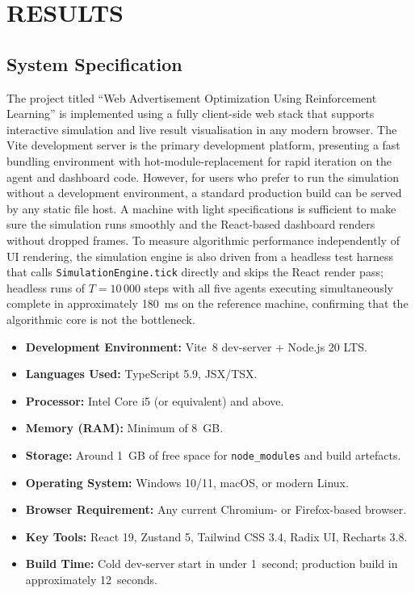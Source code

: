 \section{RESULTS}

\subsection{System Specification}
The project titled ``Web Advertisement Optimization Using Reinforcement Learning'' is implemented using a fully client-side web stack that supports interactive simulation and live result visualisation in any modern browser. The Vite development server is the primary development platform, presenting a fast bundling environment with hot-module-replacement for rapid iteration on the agent and dashboard code. However, for users who prefer to run the simulation without a development environment, a standard production build can be served by any static file host. A machine with light specifications is sufficient to make sure the simulation runs smoothly and the React-based dashboard renders without dropped frames. To measure algorithmic performance independently of UI rendering, the simulation engine is also driven from a headless test harness that calls \texttt{SimulationEngine.tick} directly and skips the React render pass; headless runs of $T = 10\,000$ steps with all five agents executing simultaneously complete in approximately 180~ms on the reference machine, confirming that the algorithmic core is not the bottleneck.

\begin{itemize}
\item \textbf{Development Environment:} Vite~8 dev-server + Node.js 20 LTS.
\item \textbf{Languages Used:} TypeScript 5.9, JSX/TSX.
\item \textbf{Processor:} Intel Core i5 (or equivalent) and above.
\item \textbf{Memory (RAM):} Minimum of 8~GB.
\item \textbf{Storage:} Around 1~GB of free space for \texttt{node\_modules} and build artefacts.
\item \textbf{Operating System:} Windows 10/11, macOS, or modern Linux.
\item \textbf{Browser Requirement:} Any current Chromium- or Firefox-based browser.
\item \textbf{Key Tools:} React 19, Zustand 5, Tailwind CSS 3.4, Radix UI, Recharts 3.8.
\item \textbf{Build Time:} Cold dev-server start in under 1~second; production build in approximately 12~seconds.
\end{itemize}

